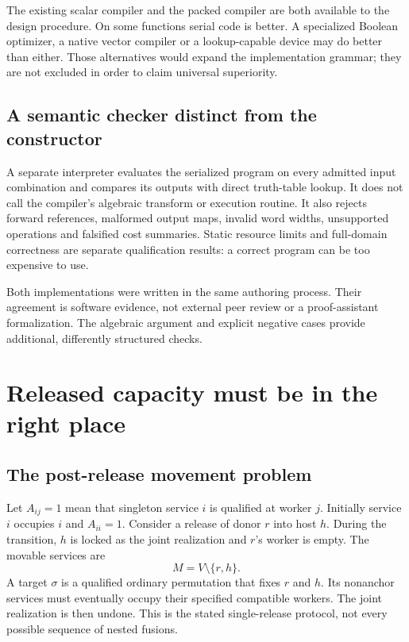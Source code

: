 \documentclass[11pt,letterpaper]{article}
\theoremstyle{definition}\newtheorem{definition}[theorem]{Definition}
\theoremstyle{remark}\newtheorem{remark}[theorem]{Remark}
\begin{document}
The existing scalar compiler and the packed compiler are both available to the design procedure. On some functions serial code is better. A specialized Boolean optimizer, a native vector compiler or a lookup-capable device may do better than either. Those alternatives would expand the implementation grammar; they are not excluded in order to claim universal superiority.

\subsection{A semantic checker distinct from the constructor}
A separate interpreter evaluates the serialized program on every admitted input combination and compares its outputs with direct truth-table lookup. It does not call the compiler's algebraic transform or execution routine. It also rejects forward references, malformed output maps, invalid word widths, unsupported operations and falsified cost summaries. Static resource limits and full-domain correctness are separate qualification results: a correct program can be too expensive to use.

Both implementations were written in the same authoring process. Their agreement is software evidence, not external peer review or a proof-assistant formalization. The algebraic argument and explicit negative cases provide additional, differently structured checks.

\section{Released capacity must be in the right place}
\label{sec:topology}
\subsection{The post-release movement problem}
Let $A_{ij}=1$ mean that singleton service $i$ is qualified at worker $j$. Initially service $i$ occupies $i$ and $A_{ii}=1$. Consider a release of donor $r$ into host $h$. During the transition, $h$ is locked as the joint realization and $r$'s worker is empty. The movable services are
\begin{equation}
 M=V\setminus\{r,h\}.
\end{equation}
A target $\sigma$ is a qualified ordinary permutation that fixes $r$ and $h$. Its nonanchor services must eventually occupy their specified compatible workers. The joint realization is then undone. This is the stated single-release protocol, not every possible sequence of nested fusions.
\end{document}
